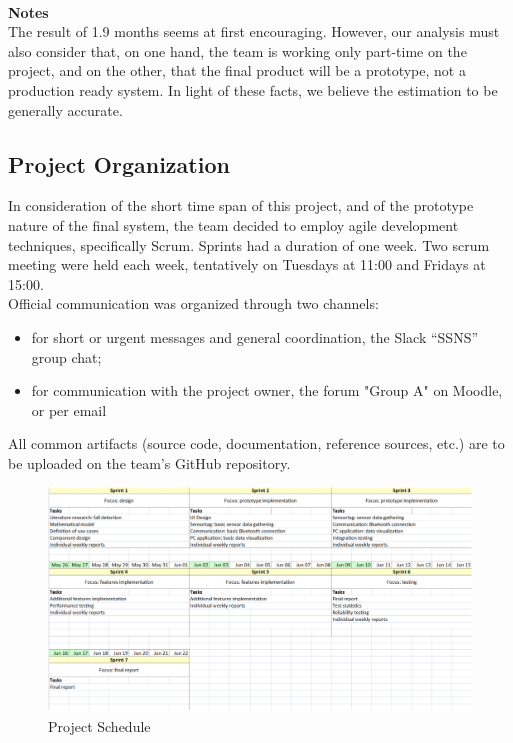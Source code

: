 \documentclass[conference,12pt]{IEEETran}
\begin{document}
\textbf{\\Notes}
\\The result of 1.9 months seems at first encouraging. However, our 
analysis must also consider that, on one hand, the team is working only 
part-time on the project, and on the other, that the final product will 
be a prototype, not a production ready system. In light of these facts, 
we believe the estimation to be generally accurate.

\subsection{Project Organization}

In consideration of the short time span of this project, and of the prototype nature of the final system, the team decided to employ agile development techniques, specifically Scrum. Sprints had a duration of one week. Two scrum meeting were held each week, tentatively on Tuesdays at 11:00 and Fridays at 15:00.\\
Official communication was organized through two channels:
\begin{itemize}
	\item for short or urgent messages and general coordination, the Slack “SSNS” group chat;
	\item for communication with the project owner, the forum "Group A" on Moodle, or per email
\end{itemize}
All common artifacts (source code, documentation, reference sources, etc.) are to be uploaded on the team’s GitHub repository.

\FloatBarrier
\begin{figure}[!h]
	\centering
	\includegraphics[scale=0.50]{images/Proj_Sched.png}
	\caption{Project Schedule}
	\label{img:Proj_Sched}
\end{figure}
\FloatBarrier
\end{document}
